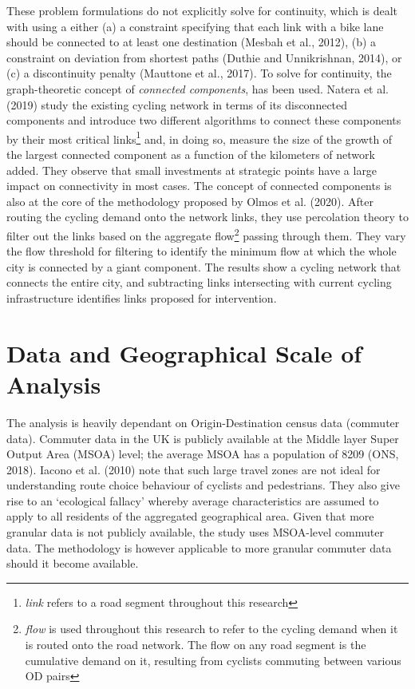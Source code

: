\documentclass[]{elsarticle} %
\begin{document}
These problem formulations do not explicitly solve for continuity, which
is dealt with using a either (a) a constraint specifying that each link
with a bike lane should be connected to at least one destination (Mesbah
et al., 2012), (b) a constraint on deviation from shortest paths (Duthie
and Unnikrishnan, 2014), or (c) a discontinuity penalty (Mauttone et
al., 2017). To solve for continuity, the graph-theoretic concept of
\emph{connected components}, has been used. Natera et al. (2019) study
the existing cycling network in terms of its disconnected components and
introduce two different algorithms to connect these components by their
most critical
links\footnote{\textit{link} refers to a road segment throughout this research}
and, in doing so, measure the size of the growth of the largest
connected component as a function of the kilometers of network added.
They observe that small investments at strategic points have a large
impact on connectivity in most cases. The concept of connected
components is also at the core of the methodology proposed by Olmos et
al. (2020). After routing the cycling demand onto the network links,
they use percolation theory to filter out the links based on the
aggregate
flow\footnote{\textit{flow} is used throughout this research to refer to the cycling demand when it is routed onto the road network. The flow on any road segment is the cumulative demand on it, resulting from cyclists commuting between various OD pairs}
passing through them. They vary the flow threshold for filtering to
identify the minimum flow at which the whole city is connected by a
giant component. The results show a cycling network that connects the
entire city, and subtracting links intersecting with current cycling
infrastructure identifies links proposed for intervention.

\hypertarget{data-and-geographical-scale-of-analysis}{%
\section{Data and Geographical Scale of
Analysis}\label{data-and-geographical-scale-of-analysis}}

The analysis is heavily dependant on Origin-Destination census data
(commuter data). Commuter data in the UK is publicly available at the
Middle layer Super Output Area (MSOA) level; the average MSOA has a
population of 8209 (ONS, 2018). Iacono et al. (2010) note that such
large travel zones are not ideal for understanding route choice
behaviour of cyclists and pedestrians. They also give rise to an
`ecological fallacy' whereby average characteristics are assumed to
apply to all residents of the aggregated geographical area. Given that
more granular data is not publicly available, the study uses MSOA-level
commuter data. The methodology is however applicable to more granular
commuter data should it become available.
\end{document}
